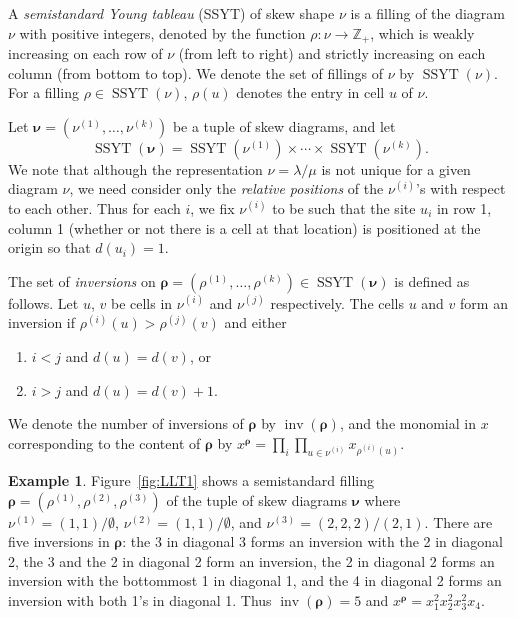 \documentclass[11pt]{article}
\theoremstyle{definition}
\newtheorem{example}[theo]{Example}
\numberwithin{equation}{section}
\DeclareMathOperator{\inv}{inv}
\DeclareMathOperator{\SSYT}{SSYT}
\begin{document}
A \emph{semistandard Young tableau} (SSYT) of skew shape $\nu$ is a filling of the diagram $\nu$ with positive integers, denoted by the function $\rho:\nu \rightarrow \mathbb{Z}_+$, which is weakly increasing on each row of $\nu$ (from left to right) and strictly increasing on each column (from bottom to top). We denote the set of fillings of $\nu$ by $\SSYT(\nu)$. For a filling $\rho\in\SSYT(\nu)$, $\rho(u)$ denotes the entry in cell $u$ of $\nu$.

Let $\boldsymbol{\nu}=(\nu^{(1)},\ldots,\nu^{(k)})$ be a tuple of skew diagrams, and let 
\[
\SSYT(\boldsymbol{\nu})=\SSYT(\nu^{(1)})\times\cdots\times\SSYT(\nu^{(k)}).
\] 
We note that although the representation $\nu=\lambda/\mu$ is not unique for a given diagram $\nu$, we need consider only the \emph{relative positions} of the $\nu^{(i)}$'s with respect to each other. Thus for each $i$, we fix $\nu^{(i)}$ to be such that the site $u_i$ in row 1, column 1 (whether or not there is a cell at that location) is positioned at the origin so that $d(u_i)=1$. 

\begin{defn}\label{def:LLTinversions}
The set of \emph{inversions} on $\boldsymbol{\rho}=(\rho^{(1)},\ldots,\rho^{(k)})\in\SSYT(\boldsymbol{\nu})$ is defined as follows. Let $u$, $v$ be cells in $\nu^{(i)}$ and $\nu^{(j)}$ respectively.
The cells $u$ and $v$ form an inversion if $\rho^{(i)}(u)>\rho^{(j)}(v)$ and either
\begin{enumerate}[label=\roman*.]
\item $i<j$ and $d(u)=d(v)$, or
\item $i>j$ and $d(u)=d(v)+1$.
\end{enumerate}
\end{defn}

We denote the number of inversions of $\boldsymbol{\rho}$ by $\inv(\boldsymbol{\rho})$, and 
the monomial in $x$ corresponding to the content of $\boldsymbol{\rho}$ by
$x^{\boldsymbol{\rho}} = \prod_i \prod_{u\in \nu^{(i)}} x_{\rho^{(i)}(u)}$. 

\begin{example}
Figure~\ref{fig:LLT1} shows a semistandard filling $\boldsymbol{\rho}=(\rho^{(1)},\rho^{(2)},\rho^{(3)})$ of the tuple of skew diagrams $\boldsymbol{\nu}$ where $\nu^{(1)}=(1,1)/\emptyset$, $\nu^{(2)}=(1,1)/\emptyset$, and $\nu^{(3)}=(2,2,2)/(2,1)$. There are five inversions in $\boldsymbol{\rho}$: the 3 in diagonal 3 forms an inversion with the 2 in diagonal 2, the 3 and the 2 in diagonal 2 form an inversion, the 2 in diagonal 2 forms an inversion with the bottommost 1 in diagonal 1, and the 4 in diagonal 2 forms an inversion with both 1's in diagonal 1. Thus $\inv(\boldsymbol{\rho})=5$ and $x^{\boldsymbol{\rho}}=x_1^2x_2^2x_3^2x_4$.
\end{example}
\end{document}
